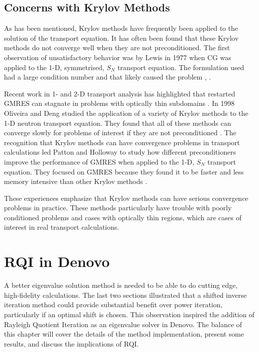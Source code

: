 \subsection{Concerns with Krylov Methods}
As has been mentioned, Krylov methods have frequently been applied to the solution of the transport equation. It has often been found that these Krylov methods do not converge well when they are not preconditioned. The first observation of unsatisfactory behavior was by Lewis in 1977 when CG was applied to the 1-D, symmetrised, $S_{N}$ transport equation. The formulation used had a large condition number and that likely caused the problem \cite{Lewis1977}, \cite{Gupta2004}. 

Recent work in 1- and 2-D transport analysis has highlighted that restarted GMRES can stagnate in problems with optically thin subdomains \cite{Rosa2010}. In 1998 Oliveira and Deng studied the application of a variety of Krylov methods to the 1-D neutron transport equation. They found that all of these methods can converge slowly for problems of interest if they are not preconditioned \cite{Oliveira1998}. The recognition that Krylov methods can have convergence problems in transport calculations led Patton and Holloway to study how different preconditioners improve the performance of GMRES when applied to the 1-D, $S_{N}$ transport equation. They focused on GMRES because they found it to be faster and less memory intensive than other Krylov methods \cite{Patton2002}. 

These experiences emphasize that Krylov methods can have serious convergence problems in practice. These methods particularly have trouble with poorly conditioned problems and cases with optically thin regions, which are cases of interest in real transport calculations.  

\section{RQI in Denovo}
A better eigenvalue solution method is needed to be able to do cutting edge, high-fidelity calculations. The last two sections illustrated that a shifted inverse iteration method could provide substantial benefit over power iteration, particularly if an optimal shift is chosen. This observation inspired the addition of Rayleigh Quotient Iteration as an eigenvalue solver in Denovo. The balance of this chapter will cover the details of the method implementation, present some results, and discuss the implications of RQI.

